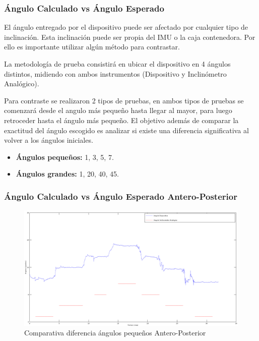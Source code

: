 \documentclass[12pt,a4paper]{article}
\begin{document}
\newpage
\subsubsection{Ángulo Calculado vs Ángulo Esperado}
El ángulo entregado por el dispositivo puede ser afectado por cualquier tipo de inclinación. Esta inclinación puede ser propia del IMU o la caja contenedora.  Por ello es importante utilizar algún método para contrastar.


La metodología de prueba consistirá en ubicar el dispositivo en 4 ángulos distintos, midiendo con ambos instrumentos (Dispositivo y Inclinómetro Analógico).


Para contraste se realizaron 2 tipos de pruebas, en ambos tipos de pruebas se comenzará desde el angulo más pequeño hasta llegar al mayor, para luego retroceder hasta el ángulo más pequeño. El objetivo además de comparar la exactitud del ángulo escogido es analizar si existe una diferencia significativa al volver a los ángulos iniciales.

\begin{itemize}
	\item \textbf{Ángulos pequeños: }1, 3, 5, 7.
	\item \textbf{Ángulos grandes: }1, 20, 40, 45.
\end{itemize}



\subsubsection{Ángulo Calculado vs Ángulo Esperado Antero-Posterior}

\begin{figure}[H]
	\centering
	\includegraphics[scale=0.4]{images/pruebas/Inclinometro/AnteroPosteriorB}
	\caption{Comparativa diferencia ángulos pequeños Antero-Posterior}
	\label{fig:inclinometroVsDispositivoAP}
\end{figure}
\end{document}
